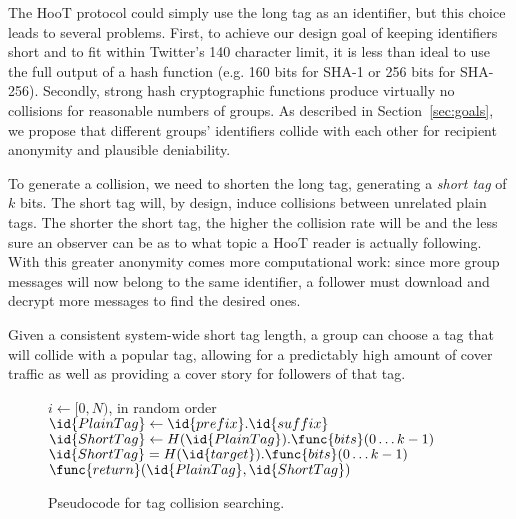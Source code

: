 The HooT protocol could simply use the long tag as an identifier, but
this choice leads to several problems. First, to achieve our design goal
of keeping identifiers short and to fit within Twitter's 140 character
limit, it is less than ideal to use the full output of a hash function
(e.g. 160 bits for SHA-1 or 256 bits for SHA-256). Secondly, strong hash
cryptographic functions produce virtually no collisions for reasonable
numbers of groups. As described in Section~\ref{sec:goals}, we propose
that different groups' identifiers collide with each other for recipient
anonymity and plausible deniability.

To generate a collision, we need to shorten the long tag, generating a
\textit{short tag} of $k$ bits. The short tag will, by design, induce
collisions between unrelated plain tags. The shorter the short tag, the
higher the collision rate will be and the less sure an observer can be
as to what topic a HooT reader is actually following. With this greater
anonymity comes more computational work: since more group messages will
now belong to the same identifier, a follower must download and decrypt
more messages to find the desired ones.

Given a consistent system-wide short tag length, a group can choose a
tag that will collide with a popular tag, allowing for a predictably
high amount of cover traffic as well as providing a cover story for
followers of that tag.
%
\begin{figure}
\begin{codebox}
\zi \For $i \gets [0,N)$, in random order
\zi \Do
\zi $\id{PlainTag} \gets  \id{prefix}.\id{suffix}$
\zi $\id{ShortTag} \gets H(\id{PlainTag}).\func{bits}(0 \ldots k-1)$
\zi \If $\id{ShortTag} = H(\id{target}).\func{bits}(0 \ldots k-1)$
\zi \Then $\func{return} (\id{PlainTag} , \id{ShortTag})$
\zi \End
\End
\end{codebox}
\caption{Pseudocode for tag collision searching.\label{fig:find-tag}}
\end{figure}

